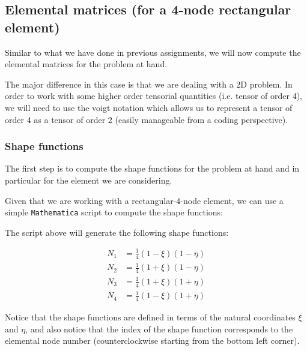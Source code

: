 \subsection{Elemental matrices (for a 4-node rectangular element)}
\label{subsec:elemental_matrices}

Similar to what we have done in previous assignments, we will now compute the elemental matrices for the problem at hand.

The major difference in this case is that we are dealing with a 2D problem.
In order to work with some higher order tensorial quantities (i.e. tensor of order 4), we will need to use the voigt notation which allows us to represent a tensor of order 4 as a tensor of order 2 (easily manageable from a coding perspective).



\subsubsection{Shape functions}
\label{subsubsec:shape_functions}

The first step is to compute the shape functions for the problem at hand and in particular for the element we are considering.

Given that we are working with a rectangular-4-node element, we can use a simple \texttt{Mathematica} script to compute the shape functions:



The script above will generate the following shape functions:

\begin{equation}
    \begin{aligned}
        N_1 & = \frac{1}{4} (1 - \xi) (1 - \eta) \\
        N_2 & = \frac{1}{4} (1 + \xi) (1 - \eta) \\
        N_3 & = \frac{1}{4} (1 + \xi) (1 + \eta) \\
        N_4 & = \frac{1}{4} (1 - \xi) (1 + \eta)
    \end{aligned}
\end{equation}

Notice that the shape functions are defined in terms of the natural coordinates $\xi$ and $\eta$, and also notice that the index of the shape function corresponds to the elemental node number (counterclockwise starting from the bottom left corner).


